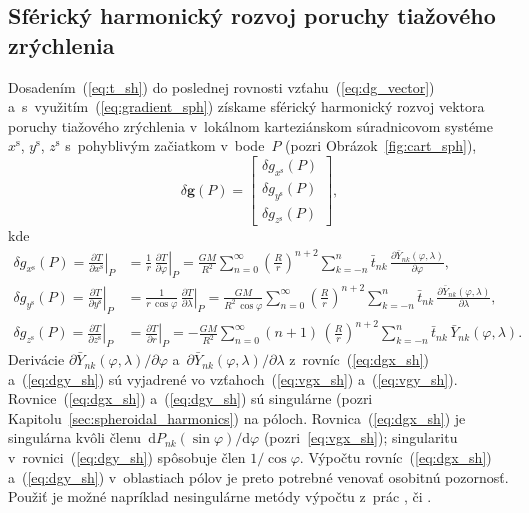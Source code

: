 \documentclass[a4paper, 12pt]{book}
\newcommand{\diff}{\mathrm d}
\let\vec\mathbf
\begin{document}
\subsection{Sférický harmonický rozvoj poruchy tiažového zrýchlenia}

Dosadením~(\ref{eq:t_sh}) do poslednej rovnosti vzťahu~(\ref{eq:dg_vector}) 
a~s~využitím~(\ref{eq:gradient_sph}) získame sférický harmonický rozvoj vektora 
poruchy tiažového zrýchlenia v~lokálnom karteziánskom súradnicovom 
systéme~$x^\mathrm{s}$, $y^\mathrm{s}$, $z^\mathrm{s}$ s~pohyblivým začiatkom 
v~bode~$P$ (pozri Obrázok~\ref{fig:cart_sph}),
%
\begin{equation}
\label{eq:dg_vec_sph}
\delta \vec g(P) =
%
\begin{bmatrix}
\delta g_{x^\mathrm{s}}(P)\\
\delta g_{y^\mathrm{s}}(P)\\
\delta g_{z^\mathrm{s}}(P)
\end{bmatrix}
%
{,}
\end{equation}
%
kde
%
\begin{align}
\label{eq:dgx_sh}
\delta g_{x^\mathrm{s}}(P) = \left.\frac{\partial T}{\partial 
x^\mathrm{s}}\right|_P &= \frac{1}{r} \, \left.\frac{\partial T}{\partial 
\varphi}\right|_P = \frac{GM}{R^2} \sum_{n = 0}^\infty \left( \frac{R}{r} 
\right)^{n + 2} \sum_{k = -n}^{n} \bar{t}_{nk} \, \frac{\partial 
\bar{Y}_{nk}(\varphi, \lambda)}{\partial \varphi}{,}\\
%
\label{eq:dgy_sh}
\delta g_{y^\mathrm{s}}(P) = \left.\frac{\partial T}{\partial 
y^\mathrm{s}}\right|_P &= \frac{1}{r \, \cos\varphi} \, \left.\frac{\partial 
T}{\partial \lambda}\right|_P = \frac{GM}{R^2 \, \cos\varphi} \sum_{n 
= 0}^\infty \left( \frac{R}{r} \right)^{n + 2} \sum_{k = -n}^{n}\bar{t}_{nk} \, 
\frac{\partial \bar{Y}_{nk}(\varphi, \lambda)}{\partial \lambda}{,}\\
%
\label{eq:dgz_sh}
\delta g_{z^\mathrm{s}}(P) = \left.\frac{\partial T}{\partial 
z^\mathrm{s}}\right|_P &= \left.\frac{\partial T}{\partial r}\right|_P 
= - \frac{GM}{R^2} \sum_{n = 0}^\infty (n + 1) \, \left( \frac{R}{r} \right)^{n 
+ 2} \sum_{k = -n}^{n} \bar{t}_{nk} \, \bar{Y}_{nk}(\varphi, \lambda){.}
\end{align}
%
Derivácie $\partial \bar{Y}_{nk}(\varphi, \lambda) \slash \partial \varphi$ 
a~$\partial \bar{Y}_{nk}(\varphi, \lambda) \slash \partial \lambda$ 
z~rovníc~(\ref{eq:dgx_sh}) a~(\ref{eq:dgy_sh}) sú vyjadrené vo 
vzťahoch~(\ref{eq:vgx_sh}) a~(\ref{eq:vgy_sh}).  Rovnice~(\ref{eq:dgx_sh}) 
a~(\ref{eq:dgy_sh}) sú singulárne (pozri 
Kapitolu~\ref{sec:spheroidal_harmonics}) na póloch.  Rovnica~(\ref{eq:dgx_sh}) 
je singulárna kvôli členu~$\diff P_{nk}(\sin\varphi) \slash \diff \varphi$ 
(pozri~\ref{eq:vgx_sh}); singularitu v~rovnici~(\ref{eq:dgy_sh}) spôsobuje člen 
$1 \slash \cos\varphi$.  Výpočtu rovníc~(\ref{eq:dgx_sh}) a~(\ref{eq:dgy_sh}) 
v~oblastiach pólov je preto potrebné venovať osobitnú pozornosť.  Použiť je 
možné napríklad nesingulárne metódy výpočtu z~prác \textcite{Petrovskaya2012}, 
\textcite{Sebera2013} či \textcite{Ivanov2018}.
\end{document}
